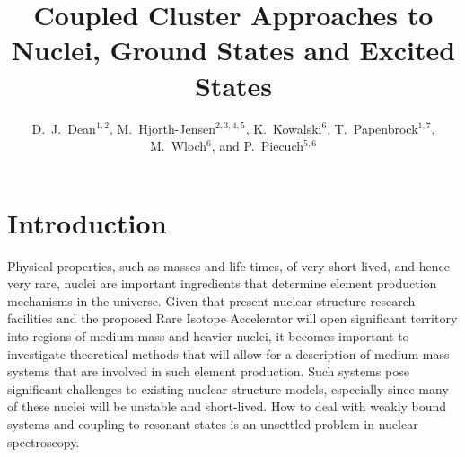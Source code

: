 \documentclass{ws-procs9x6}
\begin{document}
\title{Coupled Cluster Approaches to Nuclei, Ground States and Excited States}

\author{D.~J.~Dean$^{1,2}$, M.~Hjorth-Jensen$^{2,3,4,5}$,
K.~Kowalski$^{6}$, T.~Papenbrock$^{1,7}$, M.~Wloch$^{6}$, and 
P.~Piecuch$^{5,6}$}


\address{$^1$Physics Division, Oak Ridge National Laboratory,
P.O. Box 2008, Oak Ridge, TN 37831, USA\\
$^2$Center of Mathematics for Applications, University of Oslo, N-0316 Oslo, Norway\\
$^3$Department of Physics, University of Oslo, N-0316 Oslo, Norway\\
$^4$PH Division, CERN, CH-1211 Geneve 23, Switzerland\\
$^5$Department of Physics and Astronomy,
Michigan State University, East Lansing, MI 48824, USA\\
$^6$Department of Chemistry, Michigan State University,
East Lansing, MI 48824, USA\\
$^7$Department of Physics and Astronomy, University of Tennessee,
Knoxville, TN 37996, USA}



\maketitle


\section{Introduction}

Physical properties, such as masses and life-times,
of very short-lived, and hence very rare, nuclei are important
ingredients that determine element production mechanisms in
the universe. Given that present nuclear structure research facilities
and the proposed Rare Isotope Accelerator will open significant
territory into regions of medium-mass and heavier nuclei,
it becomes important to investigate theoretical methods that will allow
for a description of medium-mass systems that are involved in such
element production. Such systems pose significant
challenges to existing nuclear structure models, especially since many of
these nuclei will be unstable and short-lived. How to deal with weakly
bound systems and coupling to resonant states is an unsettled problem in
nuclear spectroscopy.
\end{document}
